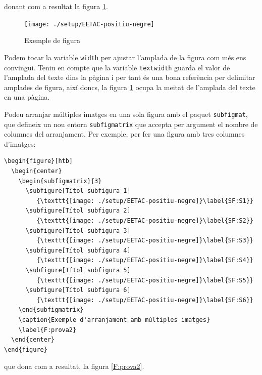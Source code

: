 donant com a resultat la figura \ref{F:prova}.

\begin{figure}[htb]
\begin{center}
\texttt{[image: ./setup/EETAC-positiu-negre]}
\caption{Exemple de figura}
\label{F:prova}
\end{center}
\end{figure}

Podem tocar la variable \texttt{width} per ajustar l'amplada de la figura com més ens convingui. Teniu en compte que la variable \texttt{textwidth} guarda el valor de l'amplada del texte dins la pàgina i per tant és una bona referència per delimitar amplades de figura, així doncs, la figura \ref{F:prova} ocupa la meitat de l'amplada del texte en una pàgina. 

Podeu arranjar múltiples imatges en una sola figura amb el paquet \texttt{subfigmat}, que defineix un nou entorn \texttt{subfigmatrix} que accepta per argument el nombre de columnes del arranjament. Per exemple, per fer una figura amb tres columnes d'imatges:

\begin{verbatim}
\begin{figure}[htb]
  \begin{center}
    \begin{subfigmatrix}{3}
      \subfigure[Títol subfigura 1]
         {\texttt{[image: ./setup/EETAC-positiu-negre]}\label{SF:S1}} 
      \subfigure[Títol subfigura 2]
         {\texttt{[image: ./setup/EETAC-positiu-negre]}\label{SF:S2}} 
      \subfigure[Títol subfigura 3]
         {\texttt{[image: ./setup/EETAC-positiu-negre]}\label{SF:S3}} 
      \subfigure[Títol subfigura 4]
         {\texttt{[image: ./setup/EETAC-positiu-negre]}\label{SF:S4}} 
      \subfigure[Títol subfigura 5]
         {\texttt{[image: ./setup/EETAC-positiu-negre]}\label{SF:S5}} 
      \subfigure[Títol subfigura 6]
         {\texttt{[image: ./setup/EETAC-positiu-negre]}\label{SF:S6}} 
    \end{subfigmatrix}
    \caption{Exemple d'arranjament amb múltiples imatges}
    \label{F:prova2}
  \end{center}
\end{figure}
\end{verbatim}

que dona com a resultat, la figura \ref{F:prova2}.

